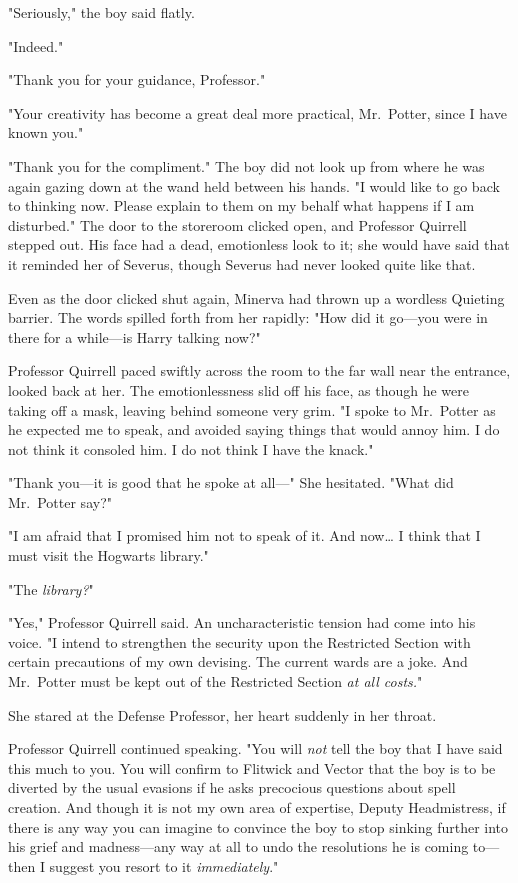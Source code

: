 "Seriously," the boy said flatly.

"Indeed."

"Thank you for your guidance, Professor."

"Your creativity has become a great deal more practical, Mr.~Potter, since I 
have known you."

"Thank you for the compliment." The boy did not look up from where he was again 
gazing down at the wand held between his hands. "I would like to go back to 
thinking now. Please explain to them on my behalf what happens if I am 
disturbed."
\sbreak
The door to the storeroom clicked open, and Professor Quirrell stepped out. His 
face had a dead, emotionless look to it; she would have said that it reminded 
her of Severus, though Severus had never looked quite like that.

Even as the door clicked shut again, Minerva had thrown up a wordless Quieting 
barrier. The words spilled forth from her rapidly: "How did it go---you were in 
there for a while---is Harry talking now?"

Professor Quirrell paced swiftly across the room to the far wall near the 
entrance, looked back at her. The emotionlessness slid off his face, as though 
he were taking off a mask, leaving behind someone very grim. "I spoke to 
Mr.~Potter as he expected me to speak, and avoided saying things that would 
annoy him. I do not think it consoled him. I do not think I have the knack."

"Thank you---it is good that he spoke at all---" She hesitated. "What did 
Mr.~Potter say?"

"I am afraid that I promised him not to speak of it. And now{\ldots} I think 
that I must visit the Hogwarts library."

"The \emph{library?}"

"Yes," Professor Quirrell said. An uncharacteristic tension had come into his 
voice. "I intend to strengthen the security upon the Restricted Section with 
certain precautions of my own devising. The current wards are a joke. And 
Mr.~Potter must be kept out of the Restricted Section \emph{at all costs.}"

She stared at the Defense Professor, her heart suddenly in her throat.

Professor Quirrell continued speaking. "You will \emph{not} tell the boy that I 
have said this much to you. You will confirm to Flitwick and Vector that the 
boy is to be diverted by the usual evasions if he asks precocious questions 
about spell creation. And though it is not my own area of expertise, Deputy 
Headmistress, if there is any way you can imagine to convince the boy to stop 
sinking further into his grief and madness---any way at all to undo the 
resolutions he is coming to---then I suggest you resort to it 
\emph{immediately}."
